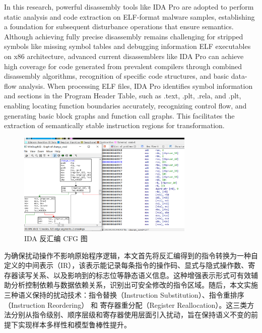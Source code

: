 In this research, powerful disassembly tools like IDA Pro are adopted to perform static analysis and code extraction on ELF-format malware samples, establishing a foundation for subsequent disturbance operations that ensure semantics. Although achieving fully precise disassembly remains challenging for stripped symbols like missing symbol tables and debugging information ELF executables on x86 architecture, advanced current disassemblers like IDA Pro can achieve high coverage for code generated from prevalent compilers through combined disassembly algorithms, recognition of specific code structures, and basic data-flow analysis. When processing ELF files, IDA Pro identifies symbol information and sections in the Program Header Table, such as .text, .plt, .rela, and .plt, enabling locating function boundaries accurately, recognizing control flow, and generating basic block graphs and function call graphs. This facilitates the extraction of semantically stable instruction regions for transformation.

\begin{figure}[hbt]
	\centering
	\includegraphics[width=0.75\textwidth]{figures/4.1}
	\caption{IDA 反汇编 CFG 图}\label{fig:4.1}
\end{figure}


为确保扰动操作不影响原始程序逻辑，本文首先将反汇编得到的指令转换为一种自定义的中间表示（IR），该表示能记录每条指令的操作码、显式与隐式操作数、寄存器读写关系、以及影响到的标志位等静态语义信息。这种增强表示形式可有效辅助分析控制依赖与数据依赖关系，识别出可安全修改的指令区域。随后，本文实施三种语义保持的扰动技术：指令替换（Instruction Substitution）、指令重排序（Instruction Reordering） 和 寄存器重分配（Register Reallocation）。这三类方法分别从指令级别、顺序层级和寄存器使用层面引入扰动，旨在保持语义不变的前提下实现样本多样性和模型鲁棒性提升。

